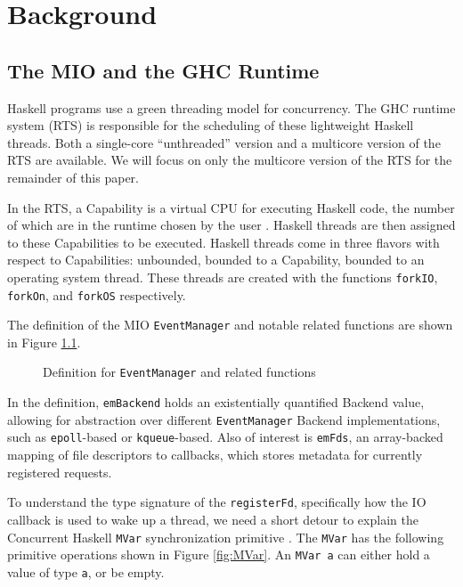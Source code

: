 \chapter{Background}

\section{The MIO and the GHC Runtime}
Haskell programs use a green threading model for concurrency. The GHC runtime system (RTS) is
responsible for the scheduling of these lightweight Haskell threads. Both a single-core “unthreaded”
version and a multicore version \cite{multicoreSupport} of the RTS are available. We will focus on only the multicore
version of the RTS for the remainder of this paper.

In the RTS, a Capability is a virtual CPU for executing Haskell code, the number of which are in the
runtime chosen by the user \cite{multicoreSupport}. Haskell threads are then assigned to these Capabilities to be 
executed. Haskell threads come in three flavors with respect to Capabilities: unbounded, bounded
to a Capability, bounded to an operating system thread. These threads are created with the functions
\texttt{forkIO}, \texttt{forkOn}, and \texttt{forkOS} respectively. 

The definition of the MIO \texttt{EventManager} and notable related
functions are shown in Figure \ref{fig:EventManager}. 

\begin{figure}[ht]
  \centering
  
  \caption[\texttt{EventManager} definition and related functions]{
  Definition for \texttt{EventManager} and related functions} 
  \label{fig:EventManager}
\end{figure}


In the definition, \texttt{emBackend} holds an existentially quantified Backend value, allowing for abstraction over
different \texttt{EventManager} Backend implementations, such as \texttt{epoll}-based or \texttt{kqueue}-based. Also of interest is \texttt{emFds},
an array-backed mapping of file descriptors to callbacks, which stores metadata for currently registered requests.

To understand the type signature of the \texttt{registerFd}, specifically how the IO callback is used to wake up a thread,
we need a short detour to explain the Concurrent Haskell \texttt{MVar} synchronization primitive \cite{concurrentHaskell}.
The \texttt{MVar} has the following primitive operations shown in Figure \ref{fig:MVar}. An \texttt{MVar a} can either hold a value of type \texttt{a}, or be empty.

